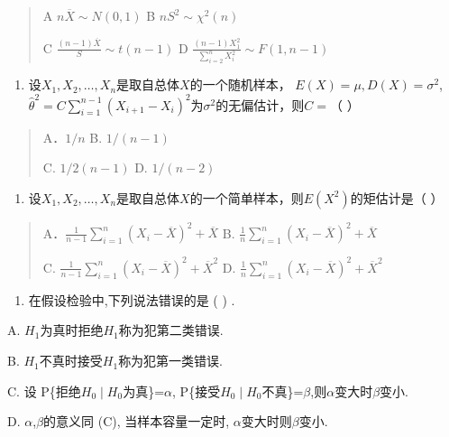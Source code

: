 \documentclass[fontset=exam]{exam-zh}
\begin{document}
\begin{quote}
A \(n\overline X\sim N(0,1)\) B \(nS^2\sim\chi^2(n)\)

C \(\frac{(n-1)\overline X}{S}\sim t(n-1)\) D \(\frac{(n-1)X_1^2}{\sum_{i=2}^nX_i^2}\sim F(1,n-1)\)
\end{quote}

\begin{enumerate}
\def\labelenumi{\arabic{enumi}.}
\setcounter{enumi}{3}
\item
  设\(X_1,X_2,\ldots,X_n\)是取自总体\(X\)的一个随机样本， \(E(X)=\mu,D(X)=\sigma^2\), \(\widehat\theta^2=C\sum_{i=1}^{n-1}(X_{i+1}-X_i)^2\)为\(\sigma^2\)的无偏估计，则\(C=\)（ ）
\end{enumerate}

\begin{quote}
A．\(1/n\) B. \(1/(n-1)\)

C. \(1/2(n-1)\) D. \(1/(n-2)\)
\end{quote}

\begin{enumerate}
\def\labelenumi{\arabic{enumi}.}
\setcounter{enumi}{4}
\item
  设\(X_1,X_2,\ldots,X_n\)是取自总体\(X\)的一个简单样本，则\(E(X^2)\)的矩估计是（ ）
\end{enumerate}

\begin{quote}
A．\(\frac1{n-1}\sum_{i=1}^n(X_i-\overline X)^2+\overline X\) B. \(\frac1n\sum_{i=1}^n(X_i-\overline X)^2+\overline X\)

C. \(\frac1{n-1}\sum_{i=1}^n(X_i-\overline X)^2+\overline X^2\) D. \(\frac1n\sum_{i=1}^n(X_i-\overline X)^2+\overline X^2\)
\end{quote}

\begin{enumerate}
\def\labelenumi{\arabic{enumi}.}
\setcounter{enumi}{5}
\item
  在假设检验中,下列说法错误的是 ( ) .
\end{enumerate}

A. \(H_1\)为真时拒绝\(H_1\)称为犯第二类错误.

B. \(H_1\)不真时接受\(H_1\)称为犯第一类错误.

C. 设 P\{拒绝\(H_0\mid H_0\)为真\}=\(\alpha\), P\{接受\(H_0\mid H_0\)不真\}=\(\beta\),则\(\alpha\)变大时\(\beta\)变小.

D. \(\alpha\),\(\beta\)的意义同 (C), 当样本容量一定时, \(\alpha\)变大时则\(\beta\)变小.

\end{document}
